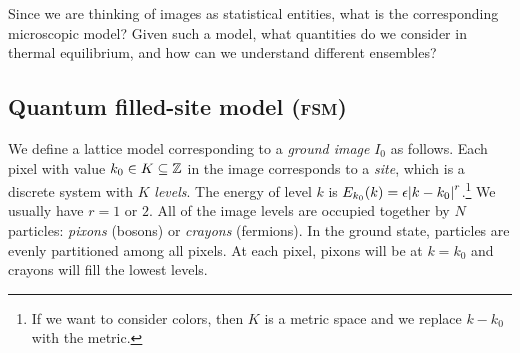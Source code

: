 \documentclass[../notebook.tex]{subfiles}
\begin{document}

Since we are thinking of images as statistical entities, what is the
corresponding microscopic model? Given such a model, what quantities do we
consider in thermal equilibrium, and how can we understand different ensembles?

\subsection{Quantum filled-site model (\textsc{fsm})}

\begin{defn}
  We define a lattice model corresponding to a \emph{ground image} $I_0$ as
  follows. Each pixel with value $k_0 \in K \subseteq \mathbb{Z}$ in the image
  corresponds to a \emph{site}, which is a discrete system with $K$
  \emph{levels}. The energy of level $k$ is $E_{k_0}(k) = \epsilon\abs{k -
    k_0}^r$.\footnote{If we want to consider colors, then $K$ is a metric space
  and we replace $k - k_0$ with the metric.} We usually have $r = 1$ or $2$. All
  of the image levels are occupied together by $N$ particles: \emph{pixons}
  (bosons) or \emph{crayons} (fermions). In the ground state, particles are
  evenly partitioned among all pixels. At each pixel, pixons will be at $k =
  k_0$ and crayons will fill the lowest levels.


\end{defn}
\end{document}
